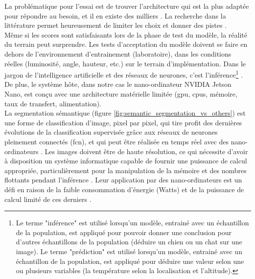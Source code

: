 \begin{comment}
Par exemple l'architecture "VGG" prend 2-3 semaines d'entrainement \parencite{simonyan_very_2015} avec 4 \acrshort{gpu} Titan Black (NVIDIA), coutant 1 200 \$US (Amazon.com) chacun (pour un total de 4 800\$US, et cela juste pour les \acrshort{gpu}s, qui ne sont qu'un des éléments de l'infrastructure nécessaire). Étant donné que de multiples tentatives sont nécessaires (cycles essai-erreur), la stratégie est d'entrainer plusieurs modèles en parallèle afin d'accélérer le développement, ce qui implique un cout élevé en infrastructure.
\end{comment}
La problématique pour l'essai est de trouver l'architecture qui est la plus adaptée pour répondre au besoin, et il en existe des milliers \parencite{koh_model_2018}. La recherche dans la littérature permet heureusement de limiter les choix et donner des pistes \parencite{zheng_real-time_2020, nguyen_mavnet_2019, nvidia_jetson_2019-1}. 
\vspace{0.5\baselineskip}
\\
\noindent Même si les scores sont satisfaisants lors de la phase de test du modèle, la réalité du terrain peut surprendre. Les tests d'acceptation du modèle doivent se faire en dehors de l'environnement d'entrainement (laboratoire), dans les conditions réelles (luminosité, angle, hauteur, etc.) sur le terrain d'implémentation. Dans le jargon de l'intelligence artificielle et des réseaux de neurones, c'est l'inférence\footnote{Le terme "inférence" est utilisé lorsqu'un modèle, entrainé avec un échantillon de la population, est appliqué pour pouvoir donner une conclusion pour d'autres échantillons de la population (déduire un chien ou un chat sur une image). Le terme "prédiction" est utilisé lorsqu'un modèle, entrainé avec un échantillon de la population, est appliqué pour déduire une valeur selon une ou plusieurs variables (la température selon la localisation et l'altitude).} \parencite{copel_whats_2016, nvidia_jetson_2019-1}. De plus, le système hôte, dans notre cas le nano-ordinateur NVIDIA Jetson Nano, est conçu avec une architecture matérielle limitée (\acrshort{gpu}, \acrshort{cpu}s, mémoire, taux de transfert, alimentation). 
\vspace{0.5\baselineskip}
\\
\noindent La segmentation sémantique (figure \ref{fig:semantic_segmentation_vs_others}) est une forme de classification d'image, pixel par pixel, qui tire profit des dernières évolutions de la classification supervisée grâce aux réseaux de neurones pleinement connectés (\acrshort{fcn}), et qui peut être réalisée en temps réel avec des nano-ordinateurs \parencite{long_fully_2015, blanco-filgueira_deep_2019}. Les images doivent être de haute résolution, ce qui nécessite d'avoir à disposition un système informatique capable de fournir une puissance de calcul appropriée, particulièrement pour la manipulation de la mémoire et des nombres flottants pendant l'inférence \parencite{mody_low_2018}. Leur application par des nano-ordinateurs est un défi en raison de la faible consommation d'énergie (Watts) et de la puissance de calcul limité de ces derniers \parencite{copel_whats_2016}.
